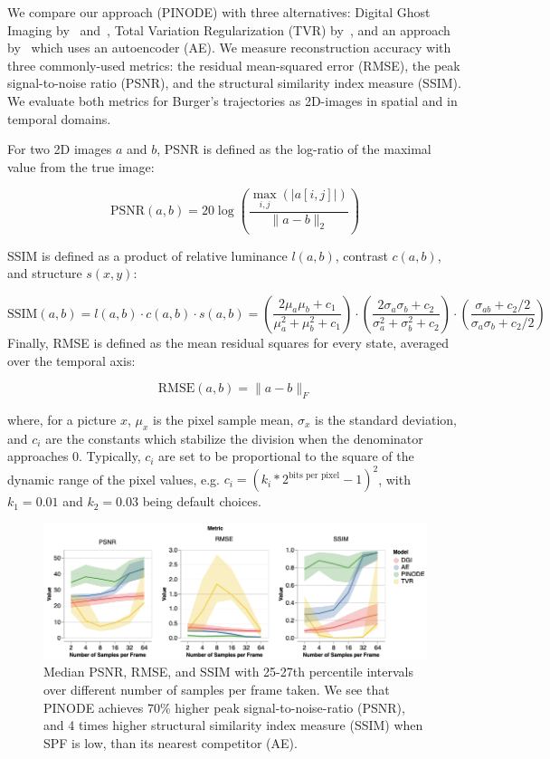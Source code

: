 We compare our approach (PINODE) with three alternatives: Digital Ghost Imaging by~\cite{ferri2010differential} and~\cite{gong2010method}, Total Variation Regularization  (TVR) by~\cite{bian2018experimental}, and an approach by~\cite{bora2017compressed} which uses an autoencoder (AE). We measure reconstruction accuracy with three commonly-used metrics: the residual mean-squared error (RMSE), the peak signal-to-noise ratio (PSNR), and the structural similarity index measure (SSIM). We evaluate both metrics for Burger's trajectories as 2D-images in spatial and in temporal domains. 

For two 2D images $a$ and $b$, PSNR is defined as the log-ratio of the maximal value from the true image:

\[
	\text{PSNR}(a, b) = 20\log\left(\frac{\max_{i,j}(|a[i,j]|)}{\|a - b\|_2}\right)
\]

SSIM is defined as a product of relative luminance $l(a,b)$, contrast $c(a,b)$, and structure $s(x,y)$:

\[
	\text{SSIM}(a, b) = l(a,b) \cdot c(a,b) \cdot s(a,b) = \left(\frac{2\mu_a\mu_b + c_1}{\mu_a^2 + \mu_b^2 + c_1}\right) \cdot \left(\frac{2\sigma_a\sigma_b + c_2}{\sigma_a^2 + \sigma_b^2 + c_2} \right) \cdot \left(\frac{\sigma_{ab} + c_2/2}{\sigma_a \sigma_b + c_2/2}\right)
\]
Finally, RMSE is defined as the mean residual squares for every state, averaged over the temporal axis:

\[
	\text{RMSE}(a,b) = \|a - b\|_F
\] 

where, for a picture $x$, $\mu_x$ is the pixel sample mean, $\sigma_x$ is the standard deviation,  and $c_i$ are the constants which stabilize the division when the denominator approaches 0. Typically, $c_i$ are set to be proportional to the square of the dynamic range of the pixel values, e.g.  $c_i = (k_i*2^{\text{bits per pixel}} - 1)^2$, with $k_1 = 0.01$ and $k_2 = 0.03$ being default choices.


\begin{figure}
    \centering
    \includegraphics[width=\textwidth]{figures/cs_burgers_psnr.png}
    \caption{\label{fig:cs_burgers_spf} Median PSNR, RMSE, and SSIM with 25-27th percentile intervals over different number of samples per frame taken. We see that PINODE achieves 70\% higher peak signal-to-noise-ratio (PSNR), and 4 times higher structural similarity index measure (SSIM) when SPF is low, than its nearest competitor (AE).}
    
\end{figure}

